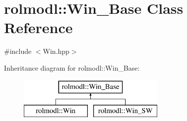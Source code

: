 \hypertarget{classrolmodl_1_1_win___base}{}\section{rolmodl\+::Win\+\_\+\+Base Class Reference}
\label{classrolmodl_1_1_win___base}


{\ttfamily \#include $<$Win.\+hpp$>$}

Inheritance diagram for rolmodl\+::Win\+\_\+\+Base\+:\begin{figure}[H]
\begin{center}
\leavevmode
\includegraphics[height=2.000000cm]{classrolmodl_1_1_win___base}
\end{center}
\end{figure}
